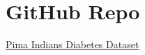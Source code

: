 \documentclass[12pt]{article}
\begin{document}


\tableofcontents 

\newpage


\newpage

\newpage
\section{GitHub Repo}
\href{https://www.kaggle.com/datasets/uciml/pima-indians-diabetes-database}{Pima Indians Diabetes Dataset}
\end{document}
